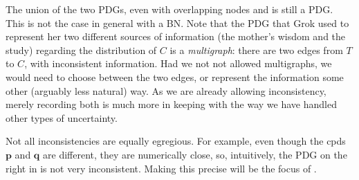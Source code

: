 \documentclass{article}
\theoremstyle{plain}
\theoremstyle{definition}
\newenvironment{example}
	{\pushQED{\qed}\renewcommand{\qedsymbol}{$\triangle$}\examplex}
	{\popQED\endexamplex%
}
\theoremstyle{remark}
\newcommand\mat[1]{\mathbf{#1}}
\newcommand{\MN}{PDG}
\numberwithin{equation}{section}
\begin{document}
\begin{example}
		The union of the two PDGs, even with overlapping nodes
                and is still a PDG. This is not the case 
                in general with a BN. Note that the PDG that Grok used
                to          represent her two 
                different sources of information (the mother's wisdom
                and the study) regarding the distribution of
               $C$ is a \emph{multigraph}: there are two 
                edges from $T$ to $C$, with inconsistent information.
                Had we not not allowed multigraphs, we would need to
                choose between the two edges, or represent the
                information some other (arguably less natural) way.
                As we are already allowing inconsistency,
                merely recording both is much more in keeping with the
                way we have handled other types of uncertainty. 
	\end{example}

Not all inconsistencies are equally egregious.
For example,
even though the cpds $\mat p$ and $\mat q$ are different, they
are numerically close, so, intuitively, the PDG on the right in
 is not very inconsistent.  
Making this precise will be the focus of	
.
\end{document}
